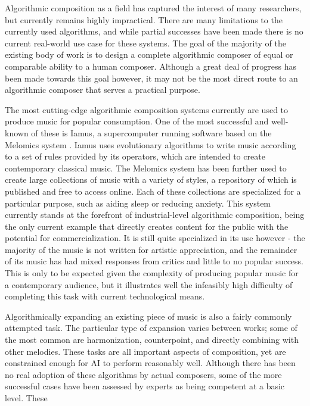 \documentclass[11pt]{article}
\begin{document}
	Algorithmic composition as a field has captured the interest of many researchers, but currently remains highly impractical. There are many limitations to the currently used algorithms, and while partial successes have been made there is no current real-world use case for these systems. The goal of the majority of the existing body of work is to design a complete algorithmic composer of equal or comparable ability to a human composer. Although a great deal of progress has been made towards this goal however, it may not be the most direct route to an algorithmic composer that serves a practical purpose. 
	
	The most cutting-edge algorithmic composition systems currently are used to produce music for popular consumption. One of the most successful and well-known of these is Iamus, a supercomputer running software based on the Melomics system \cite{diaz2011composing}. Iamus uses evolutionary algorithms to write music according to a set of rules provided by its operators, which are intended to create contemporary classical music. The Melomics system has been further used to create large collections of music with a variety of styles, a repository of which is published and free to access online. Each of these collections are specialized for a particular purpose, such as aiding sleep or reducing anxiety. This system currently stands at the forefront of industrial-level algorithmic composition, being the only current example that directly creates content for the public with the potential for commercialization. It is still quite specialized in its use however - the majority of the music is not written for artistic appreciation, and the remainder of its music has had mixed responses from critics and little to no popular success. This is only to be expected given the complexity of producing popular music for a contemporary audience, but it illustrates well the infeasibly high difficulty of completing this task with current technological means. 
	
	Algorithmically expanding an existing piece of music is also a fairly commonly attempted task. The particular type of expansion varies between works; some of the most common are harmonization, counterpoint, and directly combining with other melodies. These tasks are all important aspects of composition, yet are constrained enough for AI to perform reasonably well. Although there has been no real adoption of these algorithms by actual composers, some of the more successful cases have been assessed by experts as being competent at a basic level.
	These 
	
\end{document}
